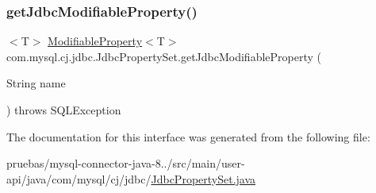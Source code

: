 \subsubsection{\texorpdfstring{get\+Jdbc\+Modifiable\+Property()}{getJdbcModifiableProperty()}}
{\footnotesize\ttfamily $<$T$>$ \mbox{\hyperlink{interfacecom_1_1mysql_1_1cj_1_1conf_1_1_modifiable_property}{Modifiable\+Property}}$<$T$>$ com.\+mysql.\+cj.\+jdbc.\+Jdbc\+Property\+Set.\+get\+Jdbc\+Modifiable\+Property (\begin{DoxyParamCaption}\item[{String}]{name }\end{DoxyParamCaption}) throws S\+Q\+L\+Exception}



The documentation for this interface was generated from the following file\+:\begin{DoxyCompactItemize}
\item 
pruebas/mysql-\/connector-\/java-\/8../src/main/user-\/api/java/com/mysql/cj/jdbc/\mbox{\hyperlink{_jdbc_property_set_8java}{Jdbc\+Property\+Set.\+java}}\end{DoxyCompactItemize}
